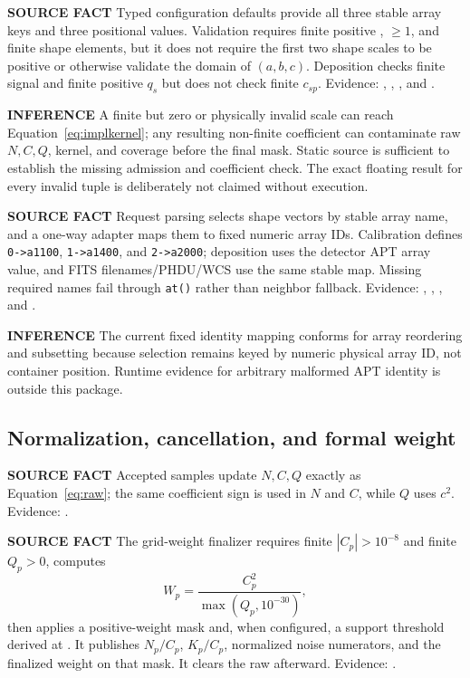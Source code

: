 \documentclass[10pt]{article}
\newcommand{\srclabel}{\textbf{SOURCE FACT}}
\newcommand{\inflabel}{\textbf{INFERENCE}}
\begin{document}
\srclabel{} Typed configuration defaults provide all three stable array keys
and three positional values.  Validation requires finite positive
, $\ge1$, and finite shape elements, but it
does not require the first two shape scales to be positive or otherwise
validate the domain of $(a,b,c)$.  Deposition checks finite signal and finite
positive $q_s$ but does not check finite $c_{sp}$.  Evidence:
,
,
, and
.

\inflabel{} A finite but zero or physically invalid scale can reach
Equation~\eqref{eq:implkernel}; any resulting non-finite coefficient can
contaminate raw $N,C,Q$, kernel, and coverage before the final mask.  Static
source is sufficient to establish the missing admission and coefficient
check.  The exact floating result for every invalid tuple is deliberately not
claimed without execution.

\srclabel{} Request parsing selects shape vectors by stable array name, and a
one-way adapter maps them to fixed numeric array IDs.  Calibration defines
\texttt{0->a1100}, \texttt{1->a1400}, and \texttt{2->a2000}; deposition uses
the detector APT array value, and FITS filenames/PHDU/WCS use the same stable
map.  Missing required names fail through \texttt{at()} rather than neighbor
fallback.  Evidence: ,
,
, and
.

\inflabel{} The current fixed identity mapping conforms for array reordering
and subsetting because selection remains keyed by numeric physical array ID,
not container position.  Runtime evidence for arbitrary malformed APT
identity is outside this package.

\subsection{Normalization, cancellation, and formal weight}

\srclabel{} Accepted samples update $N,C,Q$ exactly as
Equation~\eqref{eq:raw}; the same coefficient sign is used in $N$ and $C$,
while $Q$ uses $c^2$.  Evidence:
.

\srclabel{} The grid-weight finalizer requires finite
$|C_p|>10^{-8}$ and finite $Q_p>0$, computes
\begin{equation}
 W_p=\frac{C_p^2}{\max(Q_p,10^{-30})},
\end{equation}
then applies a positive-weight mask and, when configured, a support threshold
derived at .  It publishes $N_p/C_p$, $K_p/C_p$,
normalized noise numerators, and the finalized weight on that mask.  It clears
the raw  afterward.  Evidence:
.
\end{document}
